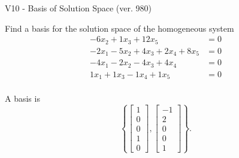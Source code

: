 \begin{exercise}
  \begin{exerciseTitle}V10 - Basis of Solution Space (ver. 980)\end{exerciseTitle}
  \begin{exerciseStatement}
    Find a basis for the solution space of the homogeneous system 
\begin{align*}
 -6 x_ 2 + 1 x_ 3 + 12 x_ 5 &= 0  \\ 
  -2 x_ 1 -5 x_ 2 + 4 x_ 3 + 2 x_ 4 + 8 x_ 5 &= 0  \\ 
  -4 x_ 1 -2 x_ 2 -4 x_ 3 + 4 x_ 4 &= 0  \\ 
  1 x_ 1 + 1 x_ 3 -1 x_ 4 + 1 x_ 5 &= 0  \\ 
 \end{align*}


 
  \end{exerciseStatement}

  \begin{exerciseAnswer}
   A basis is   
\[\left\{\left[\begin{array}{c}
1 \\
0 \\
0 \\
1 \\
0
\end{array}\right] , \left[\begin{array}{c}
-1 \\
2 \\
0 \\
0 \\
1
\end{array}\right]\right\}.\]

  


  \end{exerciseAnswer}
\end{exercise}